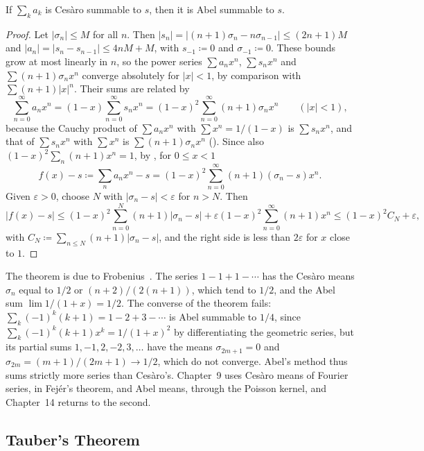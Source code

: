 \begin{theorem}
\label{thm:cesaro-abel}
If $\sum_ka_k$ is Ces\`aro summable to $s$, then it is Abel summable to $s$.
\end{theorem}

\begin{proof}
Let $|\sigma_n|\le M$ for all $n$. Then $|s_n|=|(n+1)\sigma_n-n\sigma_{n-1}|\le(2n+1)M$ and $|a_n|=|s_n-s_{n-1}|\le4nM+M$, with $s_{-1}\coloneqq0$ and $\sigma_{-1}\coloneqq0$. These bounds grow at most linearly in $n$, so the power series $\sum a_nx^n$, $\sum s_nx^n$ and $\sum(n+1)\sigma_nx^n$ converge absolutely for $|x|<1$, by comparison with $\sum(n+1)|x|^n$. Their sums are related by
\[
\sum_{n=0}^\infty a_nx^n=(1-x)\sum_{n=0}^\infty s_nx^n=(1-x)^2\sum_{n=0}^\infty(n+1)\sigma_nx^n\qquad(|x|<1),
\]
because the Cauchy product of $\sum a_nx^n$ with $\sum x^n=1/(1-x)$ is $\sum s_nx^n$, and that of $\sum s_nx^n$ with $\sum x^n$ is $\sum(n+1)\sigma_nx^n$ (). Since also $(1-x)^2\sum_n(n+1)x^n=1$, by , for $0\le x<1$
\[
f(x)-s\coloneqq\sum_na_nx^n-s=(1-x)^2\sum_{n=0}^\infty(n+1)(\sigma_n-s)x^n .
\]
Given $\varepsilon>0$, choose $N$ with $|\sigma_n-s|<\varepsilon$ for $n>N$. Then
\[
|f(x)-s|\le(1-x)^2\sum_{n=0}^N(n+1)|\sigma_n-s|+\varepsilon(1-x)^2\sum_{n=0}^\infty(n+1)x^n\le(1-x)^2C_N+\varepsilon ,
\]
with $C_N\coloneqq\sum_{n\le N}(n+1)|\sigma_n-s|$, and the right side is less than $2\varepsilon$ for $x$ close to $1$.
\end{proof}

The theorem is due to Frobenius~\cite{frobenius1880}. The series $1-1+1-\cdots$ has the Ces\`aro means $\sigma_n$ equal to $1/2$ or $(n+2)/(2(n+1))$, which tend to $1/2$, and the Abel sum $\lim1/(1+x)=1/2$. The converse of the theorem fails: $\sum_k(-1)^k(k+1)=1-2+3-\cdots$ is Abel summable to $1/4$, since $\sum_k(-1)^k(k+1)x^k=1/(1+x)^2$ by differentiating the geometric series, but its partial sums $1,-1,2,-2,3,\ldots$ have the means $\sigma_{2m+1}=0$ and $\sigma_{2m}=(m+1)/(2m+1)\to1/2$, which do not converge. Abel's method thus sums strictly more series than Ces\`aro's. Chapter~9 uses Ces\`aro means of Fourier series, in Fej\'er's theorem, and Abel means, through the Poisson kernel, and Chapter~14 returns to the second.

\subsection{Tauber's Theorem}

